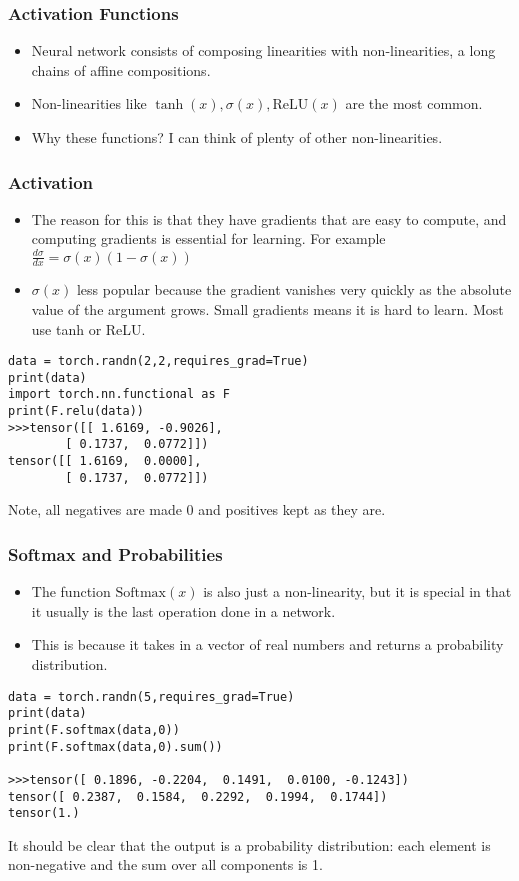 \begin{frame}[fragile]
\frametitle{Activation Functions}

\begin{itemize}
\item Neural network consists of composing linearities with non-linearities, a long chains of affine compositions.
\item Non-linearities like $\tanh(x), \sigma(x), \text{ReLU}(x)$ are the most common.
\item Why these functions? I can think of plenty of other non-linearities.
\end{itemize}
\end{frame} 

\begin{frame}[fragile]
\frametitle{Activation}

\begin{itemize}
\item The reason for this is that they have gradients that are easy to compute, and computing gradients is essential for learning. For example $ \frac{d\sigma}{dx} = \sigma(x)(1 - \sigma(x)) $
\item $ \sigma(x)$ less popular because the gradient vanishes very quickly as the absolute value of the argument grows. Small gradients means it is hard to learn. Most use tanh or ReLU.
\end{itemize}
 \begin{lstlisting}
data = torch.randn(2,2,requires_grad=True)
print(data)
import torch.nn.functional as F
print(F.relu(data))
>>>tensor([[ 1.6169, -0.9026],
        [ 0.1737,  0.0772]])
tensor([[ 1.6169,  0.0000],
        [ 0.1737,  0.0772]])
 \end{lstlisting}
 Note, all negatives are made 0 and positives kept as they are.
\end{frame} 

\begin{frame}[fragile]
\frametitle{Softmax and Probabilities}

\begin{itemize}
\item The function $\text{Softmax}(x)$ is also just a non-linearity, but it is special in that it usually is the last operation done in a network. 
\item This is because it takes in a vector of real numbers and returns a probability distribution.
\end{itemize}
 \begin{lstlisting}
data = torch.randn(5,requires_grad=True)
print(data)
print(F.softmax(data,0))
print(F.softmax(data,0).sum())

>>>tensor([ 0.1896, -0.2204,  0.1491,  0.0100, -0.1243])
tensor([ 0.2387,  0.1584,  0.2292,  0.1994,  0.1744])
tensor(1.)
 \end{lstlisting}
It should be clear that the output is a probability distribution: each element is non-negative and the sum over all components is 1.
\end{frame} 

